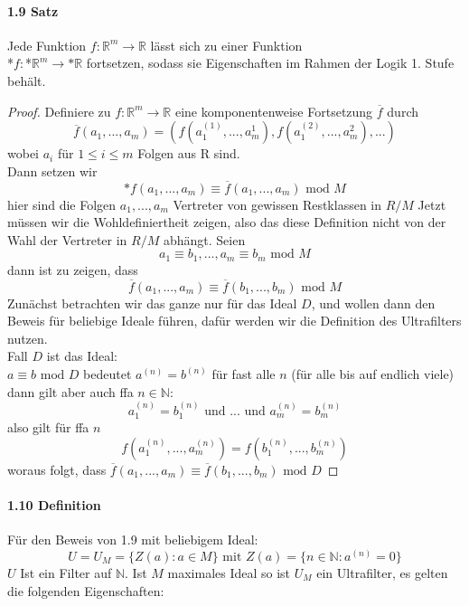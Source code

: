 \documentclass[a4paper]{article}
\begin{document}
\paragraph{1.9 Satz} 
Jede Funktion $f:\mathbb{R}^m \to \mathbb{R} $ lässt sich zu einer 
Funktion \\*$f:$*$\mathbb{R}^m \to \text{*}\mathbb{R}$ fortsetzen, sodass sie Eigenschaften im Rahmen 
der Logik 1. Stufe behält.
\begin{proof}
      Definiere zu $f:\mathbb{R}^m \to \mathbb{R} $ eine komponentenweise Fortsetzung $ \overline{f} $ durch
      $$ \overline{f}(a_1,...,a_m) = (f(a^{(1)}_1,...,a^{1}_m), f(a^{(2)}_1,...,a^{2}_m),...) $$
      wobei $ a_i $ für $ 1 \leqslant i \leqslant m $ Folgen aus R sind. \\
      Dann setzen wir 
      $$ \text{*}f(a_1,...,a_m) \equiv \overline{f}(a_1,...,a_m) \text{ mod } M $$
      hier sind die Folgen $ a_1,...,a_m $ Vertreter von gewissen Restklassen in $ R/M $
      Jetzt müssen wir die Wohldefiniertheit zeigen, also das diese Definition nicht von der Wahl 
      der Vertreter in $ R/M $ abhängt. Seien 
      $$ a_1 \equiv b_1,...,a_m \equiv b_m \text{ mod } M $$ 
      dann ist zu zeigen, dass
      $$ \overline{f}(a_1,...,a_m) \equiv \overline{f}(b_1,...,b_m) \text{ mod } M $$
      Zunächst betrachten wir das ganze nur für das Ideal $ D $, und wollen dann den Beweis für beliebige Ideale führen,
      dafür werden wir die Definition des Ultrafilters nutzen. \\
      

      Fall $ D $ ist das Ideal: \\
      $ a \equiv b \text{ mod } D $ bedeutet $ a^{(n)} = b^{(n)} $ für fast alle $ n $ (für alle bis auf endlich viele)
      dann gilt aber auch ffa $ n \in \mathbb{N} $:
      $$ a^{(n)}_1 = b^{(n)}_1 \text{ und }...\text{ und } a^{(n)}_m = b^{(n)}_m $$ 
      also gilt für ffa $ n $ 
      $$  f(a^{(n)}_1,...,a^{(n)}_m) = f(b^{(n)}_1,...,b^{(n)}_m) $$
      woraus folgt, dass $ \overline{f}(a_1,...,a_m) \equiv \overline{f}(b_1,...,b_m) \text{ mod } D $

\end{proof}

\paragraph{1.10 Definition}  Für den Beweis von 1.9 mit beliebigem Ideal: 
$$ U = U_M = \{Z(a): a \in M\} \text{ mit } Z(a) = \{n \in \mathbb{N}: a^{(n)} = 0\} $$
$U $ Ist ein Filter auf $ \mathbb{N} $. Ist $ M $ maximales Ideal so ist $ U_M $ ein Ultrafilter, es gelten die folgenden Eigenschaften: 
\end{document}
